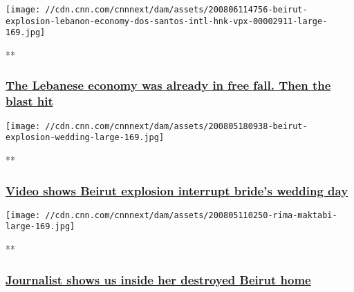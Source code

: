 \href{/videos/business/2020/08/06/beirut-explosion-lebanon-economy-dos-santos-intl-hnk-vpx.cnn/video/playlists/around-the-world/}{}

\texttt{[image: //cdn.cnn.com/cnnnext/dam/assets/200806114756-beirut-explosion-lebanon-economy-dos-santos-intl-hnk-vpx-00002911-large-169.jpg]}

**

\hypertarget{the-lebanese-economy-was-already-in-free-fall-then-the-blast-hit}{%
\subsubsection{\texorpdfstring{\href{/videos/business/2020/08/06/beirut-explosion-lebanon-economy-dos-santos-intl-hnk-vpx.cnn/video/playlists/around-the-world/}{The
Lebanese economy was already in free fall. Then the blast
hit}}{The Lebanese economy was already in free fall. Then the blast hit}}\label{the-lebanese-economy-was-already-in-free-fall-then-the-blast-hit}}

\href{/videos/world/2020/08/05/beirut-explosion-wedding-video-zw-orig.cnn/video/playlists/around-the-world/}{}

\texttt{[image: //cdn.cnn.com/cnnnext/dam/assets/200805180938-beirut-explosion-wedding-large-169.jpg]}

**

\hypertarget{video-shows-beirut-explosion-interrupt-brides-wedding-day}{%
\subsubsection{\texorpdfstring{\href{/videos/world/2020/08/05/beirut-explosion-wedding-video-zw-orig.cnn/video/playlists/around-the-world/}{Video
shows Beirut explosion interrupt bride's wedding
day}}{Video shows Beirut explosion interrupt bride's wedding day}}\label{video-shows-beirut-explosion-interrupt-brides-wedding-day}}

\href{/videos/world/2020/08/05/rima-maktabi-journalist-home-destroyed-beirut-explosion-ctw-vpx.cnn/video/playlists/around-the-world/}{}

\texttt{[image: //cdn.cnn.com/cnnnext/dam/assets/200805110250-rima-maktabi-large-169.jpg]}

**

\hypertarget{journalist-shows-us-inside-her-destroyed-beirut-home}{%
\subsubsection{\texorpdfstring{\href{/videos/world/2020/08/05/rima-maktabi-journalist-home-destroyed-beirut-explosion-ctw-vpx.cnn/video/playlists/around-the-world/}{Journalist
shows us inside her destroyed Beirut
home}}{Journalist shows us inside her destroyed Beirut home}}\label{journalist-shows-us-inside-her-destroyed-beirut-home}}

